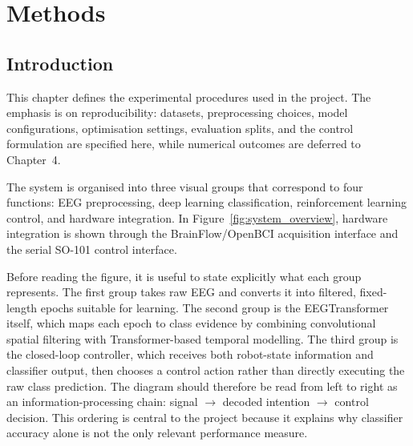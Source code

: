 \documentclass[12pt, a4paper]{article}
\begin{document}
\section{Methods}

\subsection{Introduction}

This chapter defines the experimental procedures used in the project. The emphasis is on reproducibility: datasets, preprocessing choices, model configurations, optimisation settings, evaluation splits, and the control formulation are specified here, while numerical outcomes are deferred to Chapter~4.

The system is organised into three visual groups that correspond to four functions: EEG preprocessing, deep learning classification, reinforcement learning control, and hardware integration. In Figure~\ref{fig:system_overview}, hardware integration is shown through the BrainFlow/OpenBCI acquisition interface and the serial SO-101 control interface.

Before reading the figure, it is useful to state explicitly what each group represents. The first group takes raw EEG and converts it into filtered, fixed-length epochs suitable for learning. The second group is the EEGTransformer itself, which maps each epoch to class evidence by combining convolutional spatial filtering with Transformer-based temporal modelling. The third group is the closed-loop controller, which receives both robot-state information and classifier output, then chooses a control action rather than directly executing the raw class prediction. The diagram should therefore be read from left to right as an information-processing chain: signal $\rightarrow$ decoded intention $\rightarrow$ control decision. This ordering is central to the project because it explains why classifier accuracy alone is not the only relevant performance measure.
\end{document}
